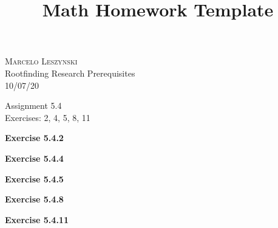 \documentclass[12pt,oneside]{article}
\newenvironment{exercise}[1]{\vspace{.1in}\noindent\textbf{Exercise #1 \hspace{.05em}}}{}
\begin{document}
\title{Math Homework Template}

\begin{flushright}
\textsc{Marcelo Leszynski}  \\
Rootfinding Research Prerequisites\\
10/07/20
\end{flushright}

\begin{center}
\textsf{Assignment 5.4 } \\
\textsf{Exercises: 2, 4, 5, 8, 11 }
\end{center}


\begin{exercise}{5.4.2}

\end{exercise}


\begin{exercise}{5.4.4}

\end{exercise}


\begin{exercise}{5.4.5}

\end{exercise}


\begin{exercise}{5.4.8}

\end{exercise}


\begin{exercise}{5.4.11}

\end{exercise}


\end{document}
